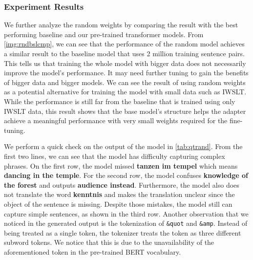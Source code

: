 \subsubsection{Experiment Results}
We further analyze the random weights by comparing the result with the best performing baseline and our pre-trained transformer models. From \cref{img:rndbslcmp}, we can see that the performance of the random model achieves a similar result to the baseline model that uses 2 million training sentence pairs. This tells us that training the whole model with bigger data does not necessarily improve the model's performance. It may need further tuning to gain the benefits of bigger data and bigger models. We can see the result of using random weights as a potential alternative for training the model with small data such as IWSLT. While the performance is still far from the baseline that is trained using only IWSLT data, this result shows that the base model's structure helps the adapter achieve a meaningful performance with very small weights required for the fine-tuning.

We perform a quick check on the output of the model in \cref{tab:qtrand}. From the first two lines, we can see that the model has difficulty capturing complex phrases. On the first row, the model missed \textbf{tanzen im tempel} which means \textbf{dancing in the temple}. For the second row, the model confuses \textbf{knowledge of the forest} and outputs \textbf{audience instead}. Furthermore, the model also does not translate the word \textbf{kenntnis} and makes the translation unclear since the object of the sentence is missing. Despite those mistakes, the model still can capture simple sentences, as shown in the third row. Another observation that we noticed in the generated output is the tokenization of \texttt{\&quot\;} and \texttt{\&amp\;}. Instead of being treated as a single token, the tokenizer treats the token as three different subword tokens. We notice that this is due to the unavailability of the aforementioned token in the pre-trained BERT vocabulary.

